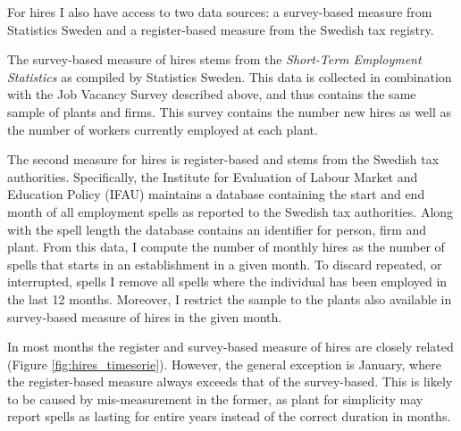 For hires I also have access to two data sources: a survey-based measure from Statistics Sweden and a register-based measure from the Swedish tax registry. 

The survey-based measure of hires stems from the \emph{Short-Term Employment Statistics} as compiled by Statistics Sweden.
This data is collected in combination with the Job Vacancy Survey described above, and thus contains the same sample of plants and firms. This survey contains the number new hires as well as the number of workers currently employed at each plant. %

The second measure for hires is register-based and stems from the Swedish tax authorities. Specifically, the Institute for Evaluation of Labour Market and Education Policy (IFAU) maintains a database containing the start and end month of all employment spells as reported to the Swedish tax authorities. Along with the spell length the database contains an identifier for person, firm and plant. From this data, I compute the number of monthly hires as the number of spells that starts in an establishment in a given month. To discard repeated, or interrupted, spells I remove all spells where the individual has been employed in the last 12 months. Moreover, I restrict the sample to the plants also available in survey-based measure of hires in the given month. %

In most months the register and survey-based measure of hires are closely related (Figure \ref{fig:hires_timeserie}). However, the general exception is January, where the register-based measure always exceeds that of the survey-based. This is likely to be caused by mis-measurement in the former, as plant for simplicity may report spells as lasting for entire years instead of the correct duration in months. %



